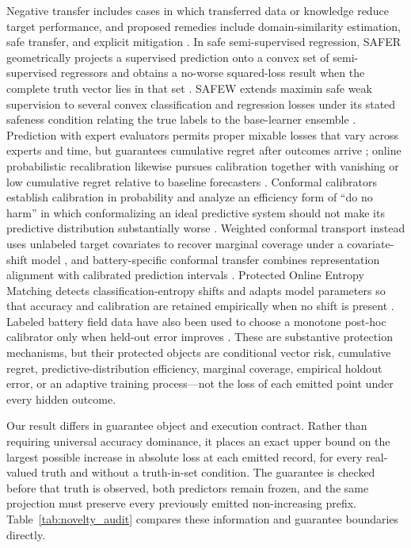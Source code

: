 \documentclass[preprint,12pt]{elsarticle}
\begin{document}
Negative transfer includes cases in which transferred data or knowledge reduce target performance, and proposed remedies include domain-similarity estimation, safe transfer, and explicit mitigation \citep{zhang2023negative}. In safe semi-supervised regression, SAFER geometrically projects a supervised prediction onto a convex set of semi-supervised regressors and obtains a no-worse squared-loss result when the complete truth vector lies in that set \citep{li2017safer}. SAFEW extends maximin safe weak supervision to several convex classification and regression losses under its stated safeness condition relating the true labels to the base-learner ensemble \citep{li2021safeweak}. Prediction with expert evaluators permits proper mixable losses that vary across experts and time, but guarantees cumulative regret after outcomes arrive \citep{chernov2009evaluators}; online probabilistic recalibration likewise pursues calibration together with vanishing or low cumulative regret relative to baseline forecasters \citep{marx2025calibrated,deshpande2025calibrated}. Conformal calibrators establish calibration in probability and analyze an efficiency form of ``do no harm'' in which conformalizing an ideal predictive system should not make its predictive distribution substantially worse \citep{vovk2020conformal}. Weighted conformal transport instead uses unlabeled target covariates to recover marginal coverage under a covariate-shift model \citep{tuwani2023transport}, and battery-specific conformal transfer combines representation alignment with calibrated prediction intervals \citep{filgueira2026conformalized}. Protected Online Entropy Matching detects classification-entropy shifts and adapts model parameters so that accuracy and calibration are retained empirically when no shift is present \citep{bar2024protected}. Labeled battery field data have also been used to choose a monotone post-hoc calibrator only when held-out error improves \citep{nyachionjeka2026safecalibrated}. These are substantive protection mechanisms, but their protected objects are conditional vector risk, cumulative regret, predictive-distribution efficiency, marginal coverage, empirical holdout error, or an adaptive training process---not the loss of each emitted point under every hidden outcome.

Our result differs in guarantee object and execution contract. Rather than requiring universal accuracy dominance, it places an exact upper bound on the largest possible increase in absolute loss at each emitted record, for every real-valued truth and without a truth-in-set condition. The guarantee is checked before that truth is observed, both predictors remain frozen, and the same projection must preserve every previously emitted non-increasing prefix. Table~\ref{tab:novelty_audit} compares these information and guarantee boundaries directly.
\end{document}
